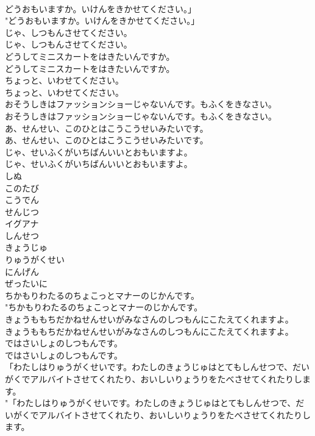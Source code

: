 \documentclass[8pt]{extreport}
\begin{document}
\begin{CJK}{UTF8}{min}
\\	どうおもいますか。いけんをきかせてください。」	
\\	"どうおもいますか。いけんをきかせてください。」 
\\	じゃ、しつもんさせてください。	
\\	じゃ、しつもんさせてください。 
\\	どうしてミニスカートをはきたいんですか。	
\\	どうしてミニスカートをはきたいんですか。 
\\	ちょっと、いわせてください。	
\\	ちょっと、いわせてください。 
\\	おそうしきはファッションショーじゃないんです。もふくをきなさい。	
\\	おそうしきはファッションショーじゃないんです。もふくをきなさい。 
\\	あ、せんせい、このひとはこうこうせいみたいです。	
\\	あ、せんせい、このひとはこうこうせいみたいです。 
\\	じゃ、せいふくがいちばんいいとおもいますよ。	
\\	じゃ、せいふくがいちばんいいとおもいますよ。 
\\	しぬ
\\	このたび
\\	こうでん
\\	せんじつ
\\	イグアナ
\\	しんせつ
\\	きょうじゅ
\\	りゅうがくせい
\\	にんげん
\\	ぜったいに
\\	ちかもりわたるのちょこっとマナーのじかんです。	
\\	"ちかもりわたるのちょこっとマナーのじかんです。 
\\	きょうももちだかねせんせいがみなさんのしつもんにこたえてくれますよ。	
\\	きょうももちだかねせんせいがみなさんのしつもんにこたえてくれますよ。 
\\	ではさいしょのしつもんです。	
\\	ではさいしょのしつもんです。 
\\	「わたしはりゅうがくせいです。わたしのきょうじゅはとてもしんせつで、だいがくでアルバイトさせてくれたり、おいしいりょうりをたべさせてくれたりします。	
\\	"「わたしはりゅうがくせいです。わたしのきょうじゅはとてもしんせつで、だいがくでアルバイトさせてくれたり、おいしいりょうりをたべさせてくれたりします。 

\end{CJK}
\end{document}

